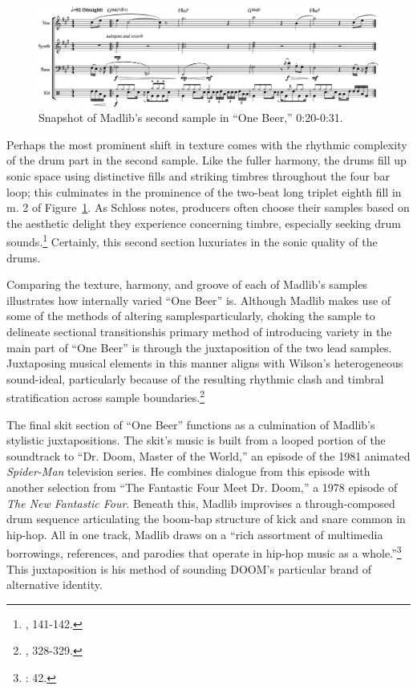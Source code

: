     \begin{figure}[ht]
        \centering
        \includegraphics[width=\textwidth]{images/figures/chp 02/020031onebeermain.pdf}
        \caption{Snapshot of Madlib's second sample in ``One Beer,'' 0:20-0:31.}
        \label{fig:onebeermain}
    \end{figure}

Perhaps the most prominent shift in texture comes with the rhythmic complexity of the drum part in the second sample. Like the fuller harmony, the drums fill up sonic space using distinctive fills and striking timbres throughout the four bar loop; this culminates in the prominence of the two-beat long triplet eighth fill in m. 2 of Figure~\ref{fig:onebeermain}. As Schloss notes, producers often choose their samples based on the aesthetic delight they experience concerning timbre, especially seeking drum sounds.\footnote{\cite{josephgschlossMakingBeatsArt2004}, 141-142.} Certainly, this second section luxuriates in the sonic quality of the drums.

Comparing the texture, harmony, and groove of each of Madlib's samples illustrates how internally varied ``One Beer'' is. Although Madlib makes use of some of the methods of altering samples\textemdash particularly, choking the sample to delineate sectional transitions\textemdash his primary method of introducing variety in the main part of ``One Beer'' is through the juxtaposition of the two lead samples. Juxtaposing musical elements in this manner aligns with Wilson's heterogeneous sound-ideal, particularly because of the resulting rhythmic clash and  timbral stratification across sample boundaries.\footnote{\cite{ollywilsonHeterogeneousSoundIdeal1992}, 328-329.}

The final skit section of ``One Beer'' functions as a culmination of Madlib's stylistic juxtapositions. The skit's music is built from a looped portion of the soundtrack to ``Dr. Doom, Master of the World,'' an episode of the 1981 animated \textit{Spider-Man} television series. He combines dialogue from this episode with another selection from ``The Fantastic Four Meet Dr. Doom,'' a 1978 episode of \textit{The New Fantastic Four}. Beneath this, Madlib improvises a through-composed drum sequence articulating the boom-bap structure of kick and snare common in hip-hop. All in one track, Madlib draws on a ``rich assortment of multimedia borrowings, references, and parodies that operate in hip-hop music as a whole.''\footnote{\cite{joannademersSampling1970sHipHop2003}: 42.} This juxtaposition is his method of sounding DOOM's particular brand of alternative identity.

